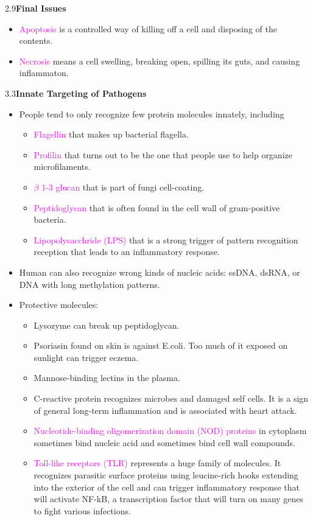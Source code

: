 \documentclass[UTF8]{book}
\newcommand{\concept}[1]{\textcolor{magenta}{#1}}
\begin{document}
2.9\quad \textbf{Final Issues}
\begin{itemize}
\item \concept{Apoptosis} is a controlled way of killing off a cell and disposing of the contents.
\item \concept{Necrosis} means a cell swelling, breaking open, spilling its guts, and causing inflammaton.
\end{itemize}
3.3\quad \textbf{Innate Targeting of Pathogens}
\begin{itemize}
\item People tend to only recognize few protein molecules innately, including 
\begin{itemize}
	\item \concept{Flagellin} that makes up bacterial flagella.
	\item \concept{Profilin} that turns out to be the one that people use to help organize microfilaments.
	\item \concept{$\beta$ 1-3 glucan} that is part of fungi cell-coating.
	\item \concept{Peptidoglycan} that is often found in the cell wall of gram-positive bacteria.
	\item \concept{Lipopolysacchride (LPS)} that is a strong trigger of pattern recognition reception that leads to an inflammatory response.
\end{itemize}
\item Human can also recognize wrong kinds of nucleic acids: ssDNA, dsRNA, or DNA with long methylation patterns.
\item Protective molecules:
\begin{itemize}
	\item Lysozyme can break up peptidoglycan.
	\item Psoriasin found on skin is against E.coli. Too much of it exposed on sunlight can trigger eczema.
	\item Mannose-binding lectins in the plasma.
	\item C-reactive protein recognizes microbes and damaged self cells. It is a sign of general long-term inflammation and is associated with heart attack.
	\item \concept{Nucleotide-binding oligomerization domain (NOD) proteins} in cytoplasm sometimes bind nucleic acid and sometimes bind cell wall compounds.
	\item \concept{Toll-like receptors (TLR)} represents a huge family of molecules. It recognizes parasitic surface proteins using leucine-rich hooks extending into the exterior of the cell and can trigger inflammatory response that will activate NF-kB, a transcription factor that will turn on many genes to fight various infections.

\end{itemize}
\end{itemize}
\end{document}
